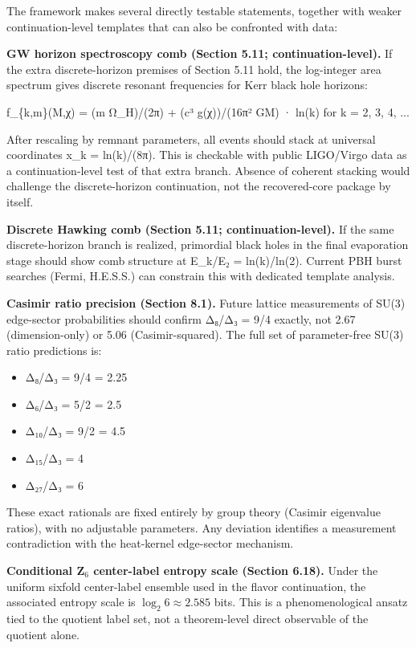 The framework makes several directly testable statements, together with weaker continuation-level templates that can also be confronted with data:

\textbf{GW horizon spectroscopy comb (Section 5.11; continuation-level).} If the extra discrete-horizon premises of Section 5.11 hold, the log-integer area spectrum gives discrete resonant frequencies for Kerr black hole horizons:

f\_\{k,m\}(M,χ) = (m Ω\_H)/(2π) + (c³ g(χ))/(16π² GM) · ln(k) for k = 2, 3, 4, ...

After rescaling by remnant parameters, all events should stack at universal coordinates x\_k = ln(k)/(8π). This is checkable with public LIGO/Virgo data as a continuation-level test of that extra branch. Absence of coherent stacking would challenge the discrete-horizon continuation, not the recovered-core package by itself.

\textbf{Discrete Hawking comb (Section 5.11; continuation-level).} If the same discrete-horizon branch is realized, primordial black holes in the final evaporation stage should show comb structure at E\_k/E₂ = ln(k)/ln(2). Current PBH burst searches (Fermi, H.E.S.S.) can constrain this with dedicated template analysis.

\textbf{Casimir ratio precision (Section 8.1).} Future lattice measurements of SU(3) edge-sector probabilities should confirm Δ₈/Δ₃ = 9/4 exactly, not 2.67 (dimension-only) or 5.06 (Casimir-squared). The full set of parameter-free SU(3) ratio predictions is:

\begin{itemize}
\tightlist
\item
  Δ₈/Δ₃ = 9/4 = 2.25
\item
  Δ₆/Δ₃ = 5/2 = 2.5
\item
  Δ₁₀/Δ₃ = 9/2 = 4.5
\item
  Δ₁₅/Δ₃ = 4
\item
  Δ₂₇/Δ₃ = 6
\end{itemize}

These exact rationals are fixed entirely by group theory (Casimir eigenvalue ratios), with no adjustable parameters. Any deviation identifies a measurement contradiction with the heat-kernel edge-sector mechanism.

\textbf{Conditional Z$_6$ center-label entropy scale (Section 6.18).} Under the uniform sixfold center-label ensemble used in the flavor continuation, the associated entropy scale is \(\log_2 6 \approx 2.585\) bits. This is a phenomenological ansatz tied to the quotient label set, not a theorem-level direct observable of the quotient alone.

